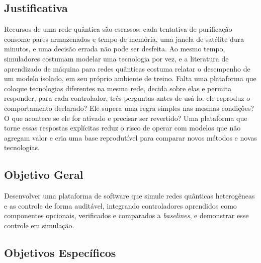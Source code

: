 \documentclass[12pt]{article}
\begin{document}
\subsection{Justificativa}

Recursos de uma rede quântica são escassos: cada tentativa de purificação
consome pares armazenados e tempo de memória, uma janela de satélite dura
minutos, e uma decisão errada não pode ser desfeita. Ao mesmo tempo, simuladores
costumam modelar uma tecnologia por vez, e a literatura de aprendizado de máquina
para redes quânticas costuma relatar o desempenho de um modelo isolado, em seu
próprio ambiente de treino. Falta uma plataforma que coloque tecnologias
diferentes na mesma rede, decida sobre elas e permita responder, para cada
controlador, três perguntas antes de usá-lo: ele reproduz o comportamento
declarado? Ele supera uma regra simples nas mesmas condições? O que acontece se
ele for ativado e precisar ser revertido? Uma plataforma que torne essas
respostas explícitas reduz o risco de operar com modelos que não agregam valor e
cria uma base reprodutível para comparar novos métodos e novas tecnologias.

\subsection{Objetivo Geral}

Desenvolver uma plataforma de software que simule redes quânticas heterogêneas e
as controle de forma auditável, integrando controladores aprendidos como
componentes opcionais, verificados e comparados a \textit{baselines}, e
demonstrar esse controle em simulação.

\subsection{Objetivos Específicos}
\end{document}
